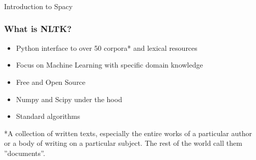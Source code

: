 
\begin{frame}[fragile]\frametitle{}

\begin{center}
{\Large Introduction to Spacy}
\end{center}
\end{frame}
%

\begin{frame}[fragile]\frametitle{What is NLTK?}
  \begin{itemize}
    \item Python interface to over 50 corpora* and lexical resources
    \item Focus on Machine Learning with specific domain knowledge
    \item Free and Open Source
    \item Numpy and Scipy under the hood
    \item Standard algorithms
  \end{itemize}
*A collection of written texts, especially the entire works of a particular author or a body of writing on a particular subject. The rest of the world call them ''documents''.
\end{frame}

